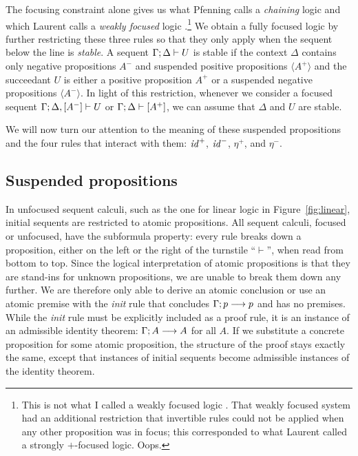 The focusing constraint alone
gives us what Pfenning calls a {\it chaining} logic
\cite{pfenning12chaining} and which Laurent calls a {\it weakly
  focused} logic \cite{laurent04proof}.\footnote{This is not what I
  called a weakly focused logic \cite{simmons09weak}. That weakly
  focused system had an additional restriction that invertible rules
  could not be applied when any other proposition was in focus; this
  corresponded to what Laurent called a strongly $+$-focused logic.
  Oops.}
We obtain a fully focused logic by further restricting these three
rules so that they only apply when the sequent below the line is {\it
  stable}.  A sequent ${\Gamma};{\Delta} \vdash {U} \mathstrut$ is stable if the
context $\Delta$ contains only negative propositions $A^-$ and
suspended positive propositions $\langle A^+ \rangle$ and the
succeedant $U$ is either a positive proposition $A^+$ or a suspended
negative propositions $\langle A^- \rangle$. In light of this restriction,
whenever we consider a focused sequent
${\Gamma};{\Delta, [A^-]} \vdash {U} \mathstrut$ or 
${\Gamma};{\Delta} \vdash {[A^+]} \mathstrut$, we can assume that $\Delta$ and $U$ 
are stable.

We will now turn our attention to the meaning of these suspended
propositions and the four rules that interact with them: ${\it id}^+$,
${\it id}^-$, $\eta^+$, and $\eta^-$.

\subsection{Suspended propositions}

In unfocused sequent calculi, such as the one for linear logic in
Figure~\ref{fig:linear}, initial sequents are restricted to atomic
propositions. All sequent calculi, focused or unfocused, have the
subformula property: every rule breaks down a proposition, either on
the left or the right of the turnstile ``$\vdash$'', 
when read from bottom to top. 
Since the logical interpretation of atomic
propositions is that they are stand-ins for unknown propositions, we
are unable to break them down any further. We are therefore only able
to derive an atomic conclusion or use an atomic premise with the {\it
  init} rule that concludes ${\Gamma};{p} \longrightarrow {p} \mathstrut$ and has no premises.
While the {\it init} rule must be explicitly included as a proof rule,
it is an instance of an admissible identity theorem:
${\Gamma};{A} \longrightarrow {A} \mathstrut$ for all $A$. If we substitute a concrete
proposition for some atomic proposition, the structure of the proof
stays exactly the same, except that instances of initial sequents
become admissible instances of the identity theorem.

